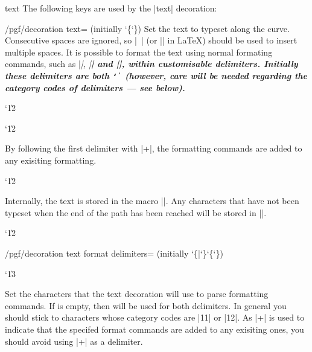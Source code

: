 \begin{decoration}{text}
  The following keys are used by the |text| decoration:
  
  \begin{key}{/pgf/decoration text= (initially \char`\{\char`\})}
    Set the text to typeset along the curve. 
    Consecutive spaces are ignored, so |\ | (or |\space| in \LaTeX) 
    should be used to insert multiple spaces.	It is possible to
    format the text using normal formating commands, such as |\it|, |\bf|
    and |\color|, within customisable delimiters. Initially these
    delimiters are both {\tt\char`\|} (however, care will be needed 
    regarding	the category codes of delimiters --- see below). 

{\catcode`\|12
\begin{codeexample}[]
\catcode`\|12
\end{codeexample}
}
  By following the first delimiter
  with |+|, the formatting commands are added to any exisiting 
  formatting.

{\catcode`\|12
\begin{codeexample}[]
\end{codeexample}
}
	
  Internally, the text is stored in the macro |\pgfdecorationtext|. 
  Any characters that have not been typeset when the end of the 
  path has been reached will be stored in |\pgfdecorationrestoftext|.

\end{key}

{\catcode`\|12
\begin{key}{/pgf/decoration text format delimiters= (initially \char`\{|\char`\}\char`\{\char`\})}

  \catcode`\|13
	
  Set the characters that the text decoration will use to parse 
  formatting commands. 
  If  is empty, then  will be used for both
  delimiters.
  In general you should stick to characters	whose category codes are 
  |11| or |12|.
  As |+| is used to indicate that the specifed format commands 
  are added	to any exisiting ones, you should avoid using |+| as
  a delimiter. 


\end{key}}
\end{decoration}
